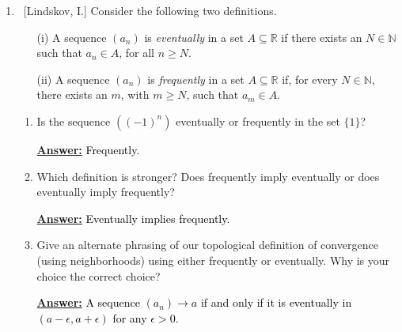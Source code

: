 \documentclass[10pt]{article}
\begin{document}
\begin{enumerate}
\begin{enumerate}
	\item  Is the converse true?  Either provide a counterexample or a proof.
 
  \textbf{\underline{Answer:}}
 \textcolor{black}{The converse of this statement is not true.}
 
 \begin{proof}
 Let $a_n=(-1)^n; n \in \mathbb{N}$.  Then $|a_n| = 1; n \in \mathbb{N}$.  Therefore, $|a_n| \rightarrow 1$.  But $a_n=(-1,1,-1,1,...)$ does not converge.  Thus the converse of this statement is not true.
 \end{proof}
	\end{enumerate}
	
	
\item  ~[Lindskov, I.] Consider the following two definitions.

	\begin{enumerate}
	
	\item[(i)]  A sequence $(a_n)$ is \emph{eventually} in a set $A \subseteq \mathbb{R}$ if there exists an $N \in \mathbb{N}$ such that $a_n \in A$, for all $n \geq N$.
	
	\item[(ii)]  A sequence $(a_n)$ is \emph{frequently} in a set $A \subseteq \mathbb{R}$ if, for every $N \in \mathbb{N}$, there exists an $m$, with $m \geq N$, such that $a_m \in A$.
	
	\end{enumerate}
	
	\begin{enumerate}
	
	\item  Is the sequence $((-1)^n)$ eventually or frequently in the set $\{ 1 \}$?
 
	 \textbf{\underline{Answer:}}
  \textcolor{black}{Frequently.}
  
	\item  Which definition is stronger?  Does frequently imply eventually or does eventually imply frequently?

  \textbf{\underline{Answer:}}
  \textcolor{black}{Eventually implies frequently.}
  
	\item  Give an alternate phrasing of our topological definition of convergence (using neighborhoods) using either frequently or eventually.  Why is your choice the correct choice?

  \textbf{\underline{Answer:}}
  \textcolor{black}{A sequence $(a_n) \rightarrow a$ if and only if it is eventually in $(a-\epsilon, a+\epsilon)$ for any $\epsilon > 0$.}
  

\end{enumerate}
\end{enumerate}
\end{document}
